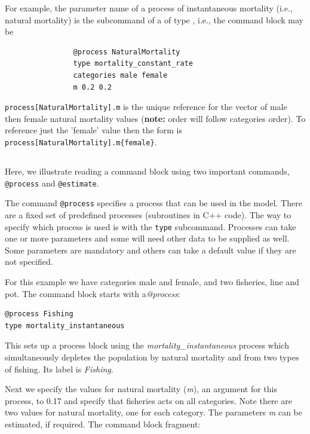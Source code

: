 For example, the parameter name of a process of instantaneous mortality (i.e., natural mortality) is the subcommand  of a  of type , i.e., the command block may be

\small{\begin{verbatim}
				@process NaturalMortality
				type mortality_constant_rate
				categories male female
				m 0.2 0.2
\end{verbatim}}
%
\texttt{process[NaturalMortality].m} is the unique reference for the vector of male then female natural mortality values (\textbf{note:} order will follow categories order). To reference just the 'female' value then the form is
\texttt{process[NaturalMortality].m\{female\}}.

\subsection{\label{sec:Readingcommandblock}}

Here, we illustrate reading a command block using two important commands, \texttt{@process} and \texttt{@estimate}.

The command \texttt{@process} specifies a process that can be used in the model. There are a fixed set of predefined processes (subroutines in C++ code). The way to specify which process is used is with the \texttt{type} subcommand. Processes can take one or more parameters and some will need other data to be supplied as well. Some parameters are mandatory and others can take a default value if they are not specified.

For this example we have categories male and female, and two fisheries, line and pot. The command block starts with a\textit{@process}:

{\small{\begin{verbatim}
@process Fishing
type mortality_instantaneous
\end{verbatim}}}

This sets up a process block using the \textit{mortality\_instantaneous} process which simultaneously depletes the population by natural mortality and from two types of fishing. Its label is \textit{Fishing}.

Next we specify the values for natural mortality (\textit{m}), an argument for this process, to 0.17 and specify that fisheries acts on all categories. Note there are two values for natural mortality, one for each category. The parameters \textit{m} can be estimated, if required. The command block fragment:

